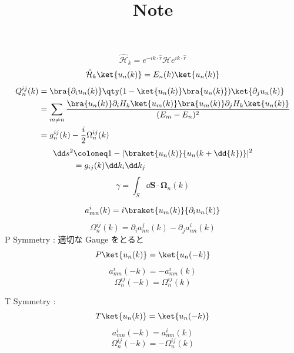 \documentclass[a4paper,12pt]{jlreq}
\title{Note}
\author{}
\date{}
\begin{document}
\maketitle
\begin{equation*}
    \hat{\mathcal{H}}_k = e^{-ik\cdot \hat{r}} \mathcal{H} e^{ik\cdot \hat{r}}
\end{equation*}
\begin{equation*}
    \hat{\mathcal{H}}_k \ket{u_n (k)} = E_n(k) \ket{u_n(k)}
\end{equation*}
\begin{align*}
    Q^{ij}_{n}(k)   & = \bra{\partial_i u_n(k)}\qty(1-\ket{u_n(k)}\bra{u_n(k)})\ket{\partial_j u_n(k)}\\
                & = \sum_{m \neq n} \frac{\bra{u_n(k)}\partial_i H_k \ket{u_m(k)}\bra{u_m(k)}\partial_j H_k \ket{u_n(k)}}{(E_m-E_n)^2}\\
                & = g^{ij}_{n}(k) - \frac{i}{2}\Omega^{ij}_{n}(k)
\end{align*}
\begin{align*}
    \dd s^2    & \coloneq 1-|\braket{u_n(k)}{u_n(k+\dd{k})}|^2\\
                & = g_{ij}(k)\dd k_i \dd k_j
\end{align*}
\begin{equation*}
    \gamma = \int_S \dd \bm{S} \cdot \bm{\Omega}_n(k) 
\end{equation*}

\newpage
\begin{equation*}
    a^{i}_{mn}(k) = i \braket{u_m(k)}{\partial_i u_n(k)}
\end{equation*}
\begin{equation*}
    \Omega^{ij}_n(k) = \partial_i a^{j}_{nn}(k) - \partial_j a^{i}_{nn}(k)
\end{equation*}
P Symmetry : 適切な Gauge をとると
\begin{equation*}
    P\ket{u_n(k)} = \ket{u_n(-k)}
\end{equation*}
\begin{equation*}
    a^{i}_{mn}(-k) = - a^{i}_{mn}(k) 
\end{equation*}
\begin{equation*}
    \Omega^{ij}_n(-k) =  \Omega^{ij}_n(k)
\end{equation*}

T Symmetry : 
\begin{equation*}
    T\ket{u_n(k)} = \ket{u_n(-k)}
\end{equation*}
\begin{equation*}
    a^{i}_{mn}(-k) = a^{i}_{nm}(k)
\end{equation*}
\begin{equation*}
    \Omega^{ij}_n(-k) =  -\Omega^{ij}_n(k)
\end{equation*}
\end{document}
